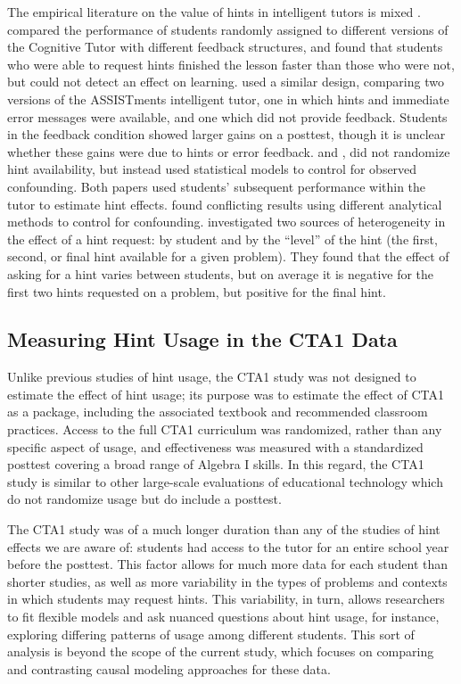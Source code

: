 \documentclass{article}\usepackage[]{graphicx}\usepackage[]{color}
\begin{document}
The empirical literature on the value of hints in intelligent tutors
is mixed \citep[see][for a summary]{goldin2012learner}.
\citet{anderson1995cognitive} compared the performance of students
randomly assigned to different versions of the Cognitive Tutor with
different feedback structures, and found that students who were able
to request hints finished the lesson faster than those who were not,
but could not detect an effect on learning.
\citet{singh2011feedback} used a similar design, comparing two
versions of the ASSISTments intelligent tutor, one in which hints and
immediate error messages were available, and one which did not provide
feedback. Students in the feedback condition showed larger gains on a
posttest, though it is unclear whether these gains were due to hints
or error feedback.
\citet{beck2008does} and \citet{goldin2012learner}, did not randomize hint
availability, but instead used statistical models to control for
observed confounding.
Both papers used students' subsequent performance within the tutor to
estimate hint effects.
\citet{beck2008does} found conflicting results using different
analytical methods to control for confounding.
\citet{goldin2012learner} investigated two sources of heterogeneity in
the effect of a hint request: by student and by the ``level'' of the
hint (the first, second, or final hint available for a given problem).
They found that the effect of asking for a hint varies
between students, but on average it is negative for the first two
hints requested on a problem, but positive for the final hint.

\subsection{Measuring Hint Usage in the CTA1 Data}
Unlike previous studies of hint usage, the CTA1 study was not designed
to estimate the effect of hint usage; its purpose was to estimate the
effect of CTA1 as a package, including the associated textbook and
recommended classroom practices.
Access to the full CTA1 curriculum was randomized, rather than any
specific aspect of usage, and effectiveness was measured with a
standardized posttest covering a broad range of Algebra I skills.
In this regard, the CTA1 study is similar to other large-scale
evaluations of educational technology which do not randomize usage but
do include a posttest.

The CTA1 study was of a much longer duration than
any of the studies of hint effects we are aware of: students had access to the tutor for an entire
school year before the posttest.
This factor allows for much more data for each student than shorter
studies, as well as more variability in the types of problems and
contexts in which students may request hints.
This variability, in turn, allows researchers to fit flexible models
and ask nuanced questions about hint usage, for instance, exploring differing
patterns of usage among different students.
This sort of analysis is beyond the scope of the current study, which
focuses on comparing and contrasting causal modeling approaches for
these data.
\end{document}
